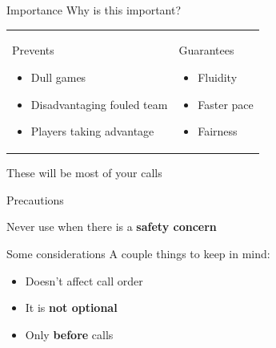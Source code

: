 \documentclass{beamer}
\begin{document}
    \begin{frame}{Importance}
        Why is this important? \pause

        \begin{tabular}{ll}
            \parbox{0.5\textwidth}
            {
                \begin{center}
                    Prevents
                \end{center}
                \begin{itemize}
                    \item Dull games
                    \item Disadvantaging fouled team
                    \item Players taking advantage
                \end{itemize}
            }
            \pause
            &
            \parbox{0.5\textwidth}
            {
                \begin{center}
                    Guarantees
                \end{center}
                \begin{itemize}
                    \item Fluidity
                    \item Faster pace
                    \item Fairness
                \end{itemize}
            }
        \end{tabular}
        \pause
        \begin{center}
            These will be most of your calls
        \end{center}
    \end{frame}

    \begin{frame}{Precautions}
        \begin{center}
            Never use when there is a \textbf{safety concern}
        \end{center}
    \end{frame}

    \begin{frame}{Some considerations}
        A couple things to keep in mind:
        \begin{itemize}
            \item Doesn't affect call order \pause
            \item It is \textbf{not optional} \pause
            \item Only \textbf{before} calls
        \end{itemize}
    \end{frame}
\end{document}
